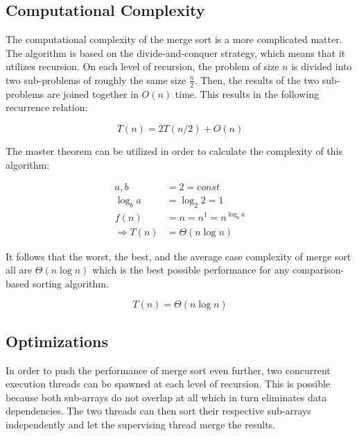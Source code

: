 \subsection{Computational Complexity}

The computational complexity of the merge sort is a more complicated matter. The algorithm is based on the divide-and-conquer strategy, which means that it utilizes recursion. On each level of recursion, the problem of size $n$ is divided into two sub-problems of roughly the same size $\frac{n}{2}$. Then, the results of the two sub-problems are joined together in $O(n)$ time. This results in the following recurrence relation:

\begin{equation*}
    T(n) = 2T(n/2) + O(n)
\end{equation*}

The master theorem can be utilized in order to calculate the complexity of this algorithm:

\begin{equation*}
    \begin{aligned}
        a, b &= 2 = const \\
        \log_b a &= \log_2 2 = 1 \\
        f(n) &= n = n^1 = n^{\log_b a} \\
        \Rightarrow T(n) &= \Theta(n \log n)
    \end{aligned}
\end{equation*}

It follows that the worst, the best, and the average case complexity of merge sort all are $\Theta(n \log n)$ which is the best possible performance for any comparison-based sorting algorithm.

\begin{equation*}
    T(n) = \Theta(n \log n)
\end{equation*}

\subsection{Optimizations}

In order to push the performance of merge sort even further, two concurrent execution threads can be spawned at each level of recursion. This is possible because both sub-arrays do not overlap at all which in turn eliminates data dependencies. The two threads can then sort their respective sub-arrays independently and let the supervising thread merge the results.

